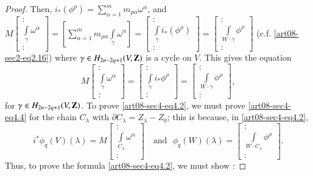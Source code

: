 \begin{proof}
Then, $i_{*}(\phi^{p})=\sum\limits^{m}_{\alpha=1}m_{p\alpha}\omega^{\alpha}$, and $M\left[\begin{smallmatrix} :\\ \int\limits_{\gamma}\omega^{\alpha}\\ :\end{smallmatrix}\right]=\left[\sum\limits^{m}_{\alpha=1}m_{\rho\alpha}\int\limits_{\gamma}\omega^{\alpha}\right]=\left[\begin{smallmatrix}:\\ \int\limits_{\gamma}i_{*}(\phi^{\rho})\\ :\end{smallmatrix}\right]=\left[\begin{smallmatrix} :\\ \int\limits_{W\cdot \gamma}\phi^{\rho}\\ :\end{smallmatrix}\right]$ (c.f. \eqref{art08-sec2-eq2.16}) where $\gamma\in H_{2n-2q+1}(V,\mathbf{Z})$ is a cycle on $V$. This gives the equation
\begin{equation}
M\begin{bmatrix}
:\\
\int\limits_{\gamma}\omega^{\alpha}\\
:
\end{bmatrix}
=
\begin{bmatrix}
:\\
\int\limits_{\gamma}i_{*}\phi^{\rho}\\
:
\end{bmatrix}
=
\begin{bmatrix}
:\\
\int\limits_{W\cdot \gamma} \phi^{\rho}\\
:
\end{bmatrix},\label{art08-sec4-eq4.4}
\end{equation}
for $\gamma\in H_{2n-2q+1}(V,\mathbf{Z})$. To prove \eqref{art08-sec4-eq4.2}, we must prove \eqref{art08-sec4-eq4.4} for the chain $C_{\lambda}$ with $\partial C_{\lambda}=Z_{\lambda}-Z_{0}$; this is because, in \eqref{art08-sec4-eq4.2},
$$
i^{*}\phi_{q}(V)(\lambda)=M
\begin{bmatrix}
:\\
\int\limits_{C_{\lambda}}\omega^{\alpha}\\
:
\end{bmatrix}
\text{~~ and~~} \phi_{q}(W)(\lambda)=
\begin{bmatrix}
:\\
\int\limits_{W\cdot C_{\lambda}}\phi^{\rho}\\
:
\end{bmatrix}.
$$
Thus, to prove the formula \eqref{art08-sec4-eq4.2}, we must show :


\end{proof}
